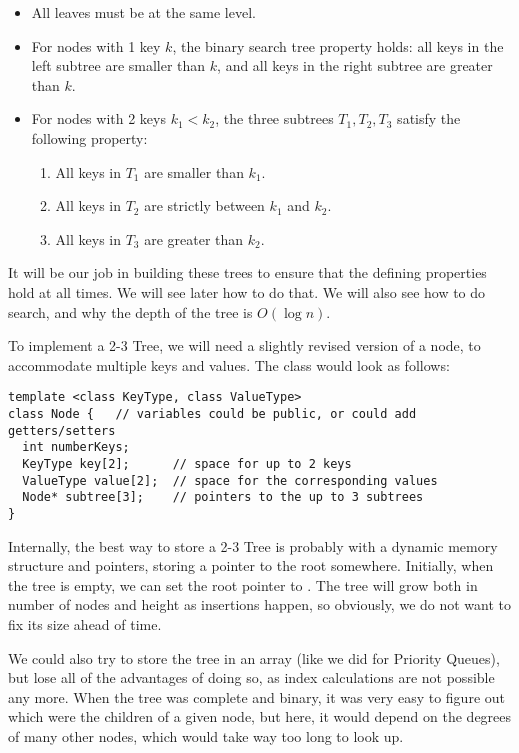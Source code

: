 \begin{itemize}
\item All leaves must be at the same level.
\item For nodes with 1 key $k$, the binary search tree property holds:
  all keys in the left subtree are smaller than $k$, 
  and all keys in the right subtree are greater than $k$.
\item For nodes with 2 keys $k_1 < k_2$, the three subtrees $T_1, T_2,
  T_3$ satisfy the following property:
  \begin{enumerate}
  \item All keys in $T_1$ are smaller than $k_1$.
  \item All keys in $T_2$ are strictly between $k_1$ and $k_2$.
  \item All keys in $T_3$ are greater than $k_2$.
  \end{enumerate}
\end{itemize}

It will be our job in building these trees to ensure that the defining
properties hold at all times. We will see later how to do that.
We will also see how to do search, and why the depth of the tree is
$O(\log n)$.

To implement a 2-3 Tree, we will need a slightly revised version of a
node, to accommodate multiple keys and values. The class would look as
follows:

\begin{verbatim}
template <class KeyType, class ValueType>
class Node {   // variables could be public, or could add getters/setters
  int numberKeys;
  KeyType key[2];      // space for up to 2 keys
  ValueType value[2];  // space for the corresponding values
  Node* subtree[3];    // pointers to the up to 3 subtrees
}
\end{verbatim}

Internally, the best way to store a 2-3 Tree is probably with a
dynamic memory structure and pointers, storing a pointer to the root
somewhere. Initially, when the tree is empty, we can set the root
pointer to . The tree will grow both in number of nodes and
height as insertions happen, so obviously, we do not want to fix its
size ahead of time.

We could also try to store the tree in an array (like we did for
Priority Queues), but lose all of the advantages of doing so, as index
calculations are not possible any more. When the tree was complete and
binary, it was very easy to figure out which were the children of a
given node, but here, it would depend on the degrees of many other
nodes, which would take way too long to look up.

